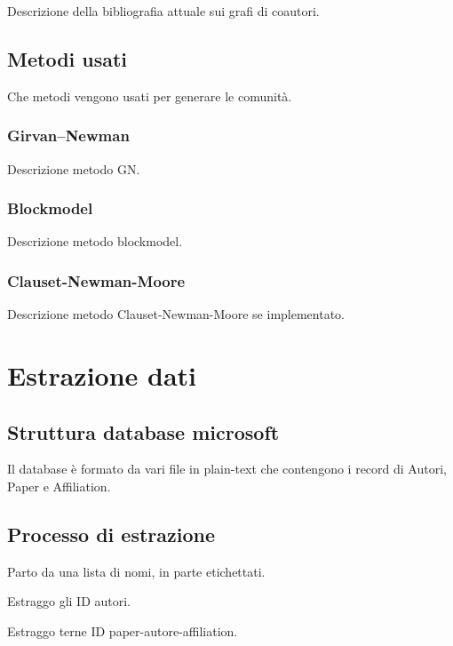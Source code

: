 \documentclass[12pt,a4paper,twoside]{report}
\begin{document}
Descrizione della bibliografia attuale sui grafi di coautori.

\section{Metodi usati} \label{sec:metodi}
Che metodi vengono usati per generare le comunità.

\subsection{Girvan–Newman} \label{subsec:gn}
Descrizione metodo GN.

\subsection{Blockmodel} \label{subsec:bn}
Descrizione metodo blockmodel.

\subsection{Clauset-Newman-Moore} \label{subsec:cnm}
Descrizione metodo Clauset-Newman-Moore se implementato.



\whitePage
\chapter{Estrazione dati} \label{cap:estrazione}

\section{Struttura database microsoft} \label{sec:msr}
Il database è formato da vari file in plain-text che contengono i record di Autori, Paper e Affiliation.

\section{Processo di estrazione} \label{sec:processo}

Parto da una lista di nomi, in parte etichettati.

Estraggo gli ID autori.

Estraggo terne ID paper-autore-affiliation.
\end{document}
